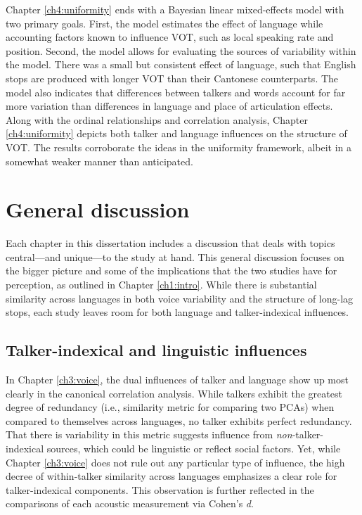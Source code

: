 Chapter \ref{ch4:uniformity} ends with a Bayesian linear mixed-effects model with two primary goals. First, the model estimates the effect of language while accounting factors known to influence VOT, such as local speaking rate and position. Second, the model allows for evaluating the sources of variability within the model. There was a small but consistent effect of language, such that English stops are produced with longer VOT than their Cantonese counterparts. The model also indicates that differences between talkers and words account for far more variation than differences in language and place of articulation effects. Along with the ordinal relationships and correlation analysis, Chapter \ref{ch4:uniformity} depicts both talker and language influences on the structure of VOT. The results corroborate the ideas in the uniformity framework, albeit in a somewhat weaker manner than anticipated. 

\section{General discussion}\label{ch5:sec:discussion}

Each chapter in this dissertation includes a discussion that deals with topics central---and unique---to the study at hand. This general discussion focuses on the bigger picture and some of the implications that the two studies have for perception, as outlined in Chapter \ref{ch1:intro}. While there is substantial similarity across languages in both voice variability and the structure of long-lag stops, each study leaves room for both language and talker-indexical influences. 

\subsection{Talker-indexical and linguistic influences}

In Chapter \ref{ch3:voice}, the dual influences of talker and language show up most clearly in the canonical correlation analysis. While talkers exhibit the greatest degree of redundancy (i.e., similarity metric for comparing two PCAs) when compared to themselves across languages, no talker exhibits perfect redundancy. That there is variability in this metric suggests influence from \textit{non}-talker-indexical sources, which could be linguistic or reflect social factors. Yet, while Chapter \ref{ch3:voice} does not rule out any particular type of influence, the high decree of within-talker similarity across languages emphasizes a clear role for talker-indexical components. This observation is further reflected in the comparisons of each acoustic measurement via Cohen's \textit{d}. 

